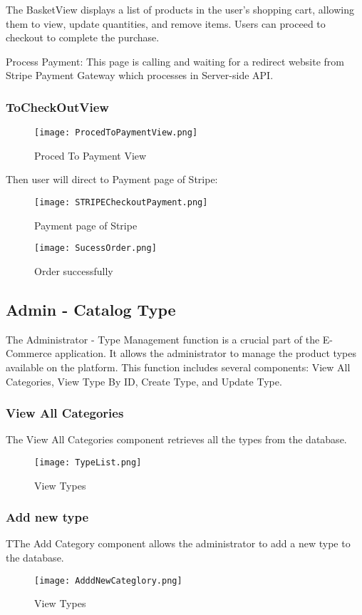 The BasketView displays a list of products in the user's shopping cart, allowing them to view, update quantities, and remove items. Users can proceed to checkout to complete the purchase.

Process Payment: This page is calling and waiting for a redirect website  from Stripe Payment Gateway which processes in  Server-side API.

\subsubsection{ToCheckOutView}

\begin{figure}[H]
    \texttt{[image: ProcedToPaymentView.png]}
    \caption{Proced To Payment View}
    \label{fig:ProcedToPaymentView}
\end{figure}

Then user will direct to Payment page of  Stripe:
\begin{figure}[H]
    \texttt{[image: STRIPECheckoutPayment.png]}
    \caption{Payment page of  Stripe}
    \label{fig:STRIPECheckoutPayment}
\end{figure}

\begin{figure}[H]
    \texttt{[image: SucessOrder.png]}
    \caption{Order successfully}
    \label{fig:SucessOrder}
\end{figure}

\subsection{Admin - Catalog Type}
The Administrator - Type Management function is a crucial part of the E-Commerce application. It allows the administrator to manage the product types available on the platform. This function includes several components: View All Categories, View Type By ID, Create Type, and Update Type.
\subsubsection[]{View All Categories}
The View All Categories component retrieves all the types from the database.
\begin{figure}[H]
    \texttt{[image: TypeList.png]}
    \caption{View Types}
    \label{fig:TypeList}
\end{figure}

\subsubsection[]{Add new type}
TThe Add Category component allows the administrator to add a new type to the database.
\begin{figure}[H]
    \texttt{[image: AdddNewCateglory.png]}
    \caption{View Types}
    \label{fig:AdddNewCateglory}
\end{figure}

